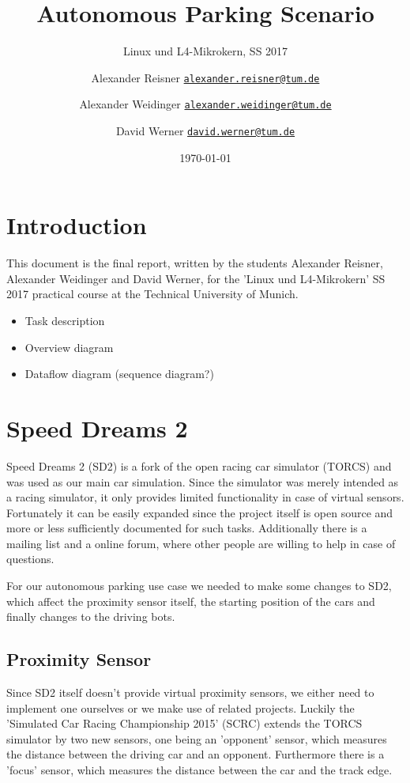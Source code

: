 \documentclass[paper=a4, fontsize=11pt]{scrreprt}
\title{Autonomous Parking Scenario}
\subtitle{Linux und L4-Mikrokern, SS 2017}
\author{Alexander Reisner \href{mailto:alexander.reisner@tum.de}{\texttt{alexander.reisner@tum.de}} \and
Alexander Weidinger \href{mailto:alexander.weidinger@tum.de}{\texttt{alexander.weidinger@tum.de}} \and
David Werner \href{mailto:david.werner@tum.de}{\texttt{david.werner@tum.de}}}
\date{\today}
\begin{document}
\maketitle
\newpage

\tableofcontents
\newpage

\chapter{Introduction}
This document is the final report, written by the students Alexander Reisner,
Alexander Weidinger and David Werner, for the 'Linux und L4-Mikrokern' SS 2017 practical course at the Technical University of Munich.

\begin{itemize}
  \item Task description
  \item Overview diagram
  \item Dataflow diagram (sequence diagram?)
\end{itemize}

\chapter{Speed Dreams 2}
Speed Dreams 2 (SD2) is a fork of the open racing car simulator (TORCS)
and was used as our main car simulation.
Since the simulator was merely intended as a racing simulator,
it only provides limited functionality in case of virtual sensors.
Fortunately it can be easily expanded since the project itself is open source
and more or less sufficiently documented for such tasks.
Additionally there is a mailing list and a online forum,
where other people are willing to help in case of questions.

For our autonomous parking use case we needed to make some changes to SD2,
which affect the proximity sensor itself, the starting position of the cars
and finally changes to the driving bots.

\section{Proximity Sensor}
Since SD2 itself doesn't provide virtual proximity sensors,
we either need to implement one ourselves or we make use of related projects.
Luckily the 'Simulated Car Racing Championship 2015' (SCRC) \cite{scrc2015} extends the TORCS simulator by two new sensors,
one being an 'opponent' sensor, which measures the distance between the driving car and an opponent.
Furthermore there is a 'focus' sensor, which measures the distance between the car and the track edge.
\end{document}
